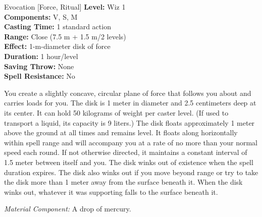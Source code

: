 {Evocation [Force, Ritual]}
{
	\textbf{Level:}
	Wiz 1\\
	\textbf{Components:}
	V, S, M\\
	\textbf{Casting Time:}
	1 standard action\\
	\textbf{Range:}
	Close (7.5 m + 1.5 m/2 levels)\\
	\textbf{Effect:}
	1-m-diameter disk of force\\
	\textbf{Duration:}
	1 hour/level\\
	\textbf{Saving Throw:}
	None\\
	\textbf{Spell Resistance:}
	No\\
}
{
	You create a slightly concave, circular plane of force that follows you about and carries loads for you. The disk is 1 meter in diameter and 2.5 centimeters deep at its center. It can hold 50 kilograms of weight per caster level. (If used to transport a liquid, its capacity is 9 liters.) The disk floats approximately 1 meter above the ground at all times and remains level. It floats along horizontally within spell range and will accompany you at a rate of no more than your normal speed each round. If not otherwise directed, it maintains a constant interval of 1.5 meter between itself and you. The disk winks out of existence when the spell duration expires. The disk also winks out if you move beyond range or try to take the disk more than 1 meter away from the surface beneath it. When the disk winks out, whatever it was supporting falls to the surface beneath it.

	\textit{Material Component:}
	A drop of mercury.

}
